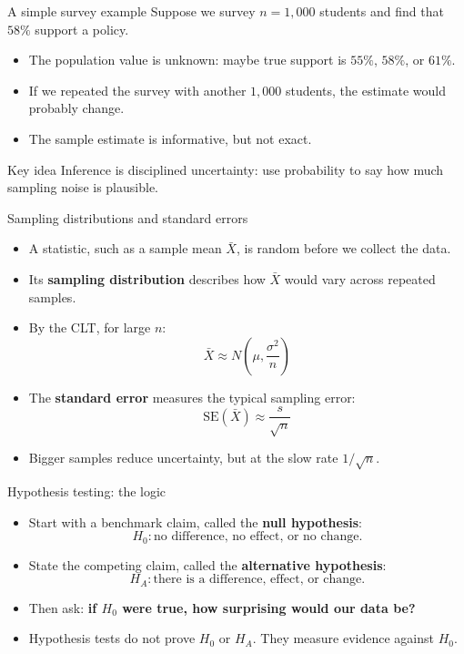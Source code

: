 \documentclass[aspectratio=169]{beamer}
\begin{document}
\begin{frame}{A simple survey example}
    Suppose we survey \(n=1{,}000\) students and find that \(58\%\) support a policy.
    \vspace{0.2cm}

    \begin{itemize}
        \item The population value is unknown: maybe true support is \(55\%\), \(58\%\), or \(61\%\).
        \item If we repeated the survey with another \(1{,}000\) students, the estimate would probably change.
        \item The sample estimate is informative, but not exact.
    \end{itemize}

    \vspace{0.2cm}
    \begin{coolblock}{Key idea}
        Inference is disciplined uncertainty: use probability to say how much sampling noise is plausible.
    \end{coolblock}
\end{frame}

\begin{frame}{Sampling distributions and standard errors}
    \begin{itemize}
        \item A statistic, such as a sample mean \(\bar{X}\), is random before we collect the data.
        \item Its \textbf{sampling distribution} describes how \(\bar{X}\) would vary across repeated samples.
        \item By the CLT, for large \(n\):
        \[
            \bar{X} \approx N\left(\mu, \frac{\sigma^2}{n}\right)
        \]
        \item The \textbf{standard error} measures the typical sampling error:
        \[
            \mathrm{SE}(\bar{X}) \approx \frac{s}{\sqrt{n}}
        \]
        \item Bigger samples reduce uncertainty, but at the slow rate \(1/\sqrt{n}\).
    \end{itemize}
\end{frame}

\begin{frame}{Hypothesis testing: the logic}
    \begin{itemize}
        \item Start with a benchmark claim, called the \textbf{null hypothesis}:
        \[
            H_0: \text{no difference, no effect, or no change.}
        \]
        \item State the competing claim, called the \textbf{alternative hypothesis}:
        \[
            H_A: \text{there is a difference, effect, or change.}
        \]
        \item Then ask: \textbf{if \(H_0\) were true, how surprising would our data be?}
        \item Hypothesis tests do not prove \(H_0\) or \(H_A\). They measure evidence against \(H_0\).
    \end{itemize}
\end{frame}
\end{document}
